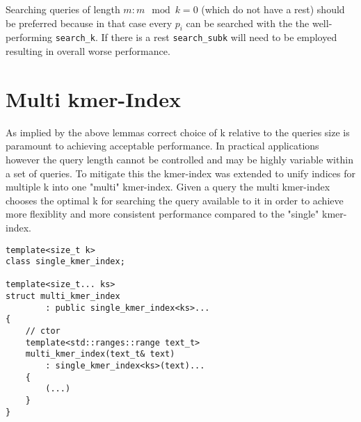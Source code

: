 Searching queries of length $m:m\mod k=0$ (which do not have a rest)
should be preferred because in that case every $p_{i}$ can be searched with the the well-performing \lstinline{search_k}.
If there is a rest \lstinline{search_subk} will need to be employed resulting in overall worse performance.

\section{Multi kmer-Index}

As implied by the above lemmas correct choice of k relative to the queries size is paramount to achieving acceptable
performance. In practical applications however the query length cannot be controlled and may be highly variable within
a set of queries. To mitigate this the kmer-index was extended to unify indices for multiple k
into one "multi" kmer-index. Given a query the multi kmer-index chooses the optimal k for searching the query available
to it in order to achieve more flexiblity and more consistent performance compared to the "single" kmer-index.

\begin{lstlisting}[caption={Class Definition and Constructor implementation of the (multi) kmer-index.},language={[GNU]C++},tabsize=2]
template<size_t k>
class single_kmer_index;

template<size_t... ks>
struct multi_kmer_index
        : public single_kmer_index<ks>...
{
	// ctor
	template<std::ranges::range text_t>
	multi_kmer_index(text_t& text)
		: single_kmer_index<ks>(text)...
	{
		(...)
	}
}

\end{lstlisting}
